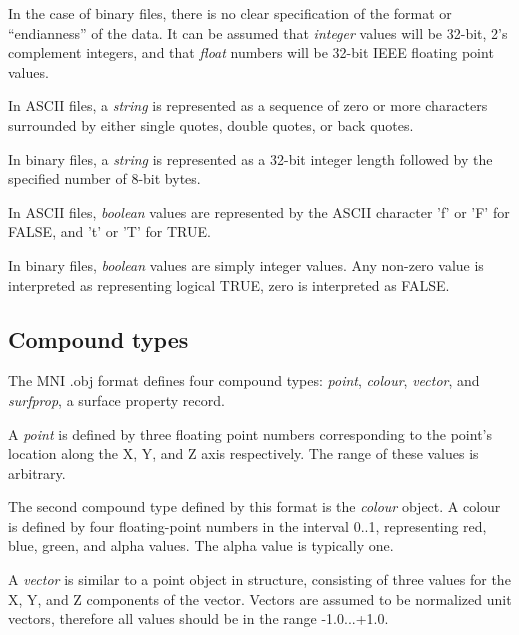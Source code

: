 \documentclass{article}
\begin{document}
In the case of binary files, there is no clear specification of the
format or ``endianness'' of the data.  It can be assumed that {\it integer}
values will be 32-bit, 2's complement integers, and that {\it float}
numbers will be 32-bit IEEE floating point values.

In ASCII files, a {\it string} is represented as a sequence of zero or more
characters surrounded by either single quotes, double quotes, or back
quotes.

In binary files, a {\it string} is represented as a 32-bit integer length
followed by the specified number of 8-bit bytes.

In ASCII files, {\it boolean} values are represented by the ASCII character
'f' or 'F' for FALSE, and 't' or 'T' for TRUE.

In binary files, {\it boolean} values are simply integer values.  Any non-zero
value is interpreted as representing logical TRUE, zero is interpreted
as FALSE.

\subsection{Compound types}

The MNI .obj format defines four compound types: {\it point}, 
{\it colour}, {\it vector}, and {\it surfprop}, a surface property record.

A {\it point} is defined by three floating point numbers corresponding to the
point's location along the X, Y, and Z axis respectively.  The range of
these values is arbitrary.

The second compound type defined by this format is the {\it colour} object.  A
colour is defined by four floating-point numbers in the interval 0..1,
representing red, blue, green, and alpha values.  The alpha value is
typically one.

A {\it vector} is similar to a point object in structure, consisting of three
values for the X, Y, and Z components of the vector.  Vectors are
assumed to be normalized unit vectors, therefore all values should be in
the range -1.0...+1.0.
\end{document}
